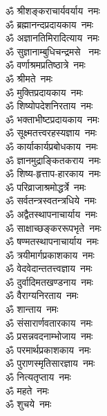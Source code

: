\begin{multicols}{2}
    \begin{flushleft}
        ॐ श्रीशङ्कराचार्यवर्याय~नमः\\
        ॐ ब्रह्मानन्दप्रदायकाय~नमः\\
        ॐ अज्ञानतिमिरादित्याय~नमः\\
        ॐ सुज्ञानाम्बुधिचन्द्रमसे ~नमः\\
        ॐ वर्णाश्रमप्रतिष्ठात्रे~नमः\\
        ॐ श्रीमते~नमः\\
        ॐ मुक्तिप्रदायकाय~नमः\\
        ॐ शिष्योपदेशनिरताय~नमः\\
        ॐ भक्ताभीष्टप्रदायकाय~नमः\\
        ॐ सूक्ष्मतत्त्वरहस्यज्ञाय~नमः\hfill{}\\
                                        
        ॐ कार्याकार्यप्रबोधकाय~नमः\\
        ॐ ज्ञानमुद्राङ्कितकराय~नमः\\
        ॐ शिष्य-हृत्ताप-हारकाय~नमः\\
        ॐ परिव्राजाश्रमोद्धर्त्रे~नमः\\
        ॐ सर्वतन्त्रस्वतन्त्रधिये~नमः\\
        ॐ अद्वैतस्थापनाचार्याय~नमः\\
        ॐ साक्षाच्छङ्कररूपभृते~नमः\\
        ॐ षण्मतस्थापनाचार्याय~नमः\\
        ॐ त्रयीमार्गप्रकाशकाय~नमः\\
        ॐ वेदवेदान्ततत्त्वज्ञाय~नमः\hfill{}\\
                                        
        ॐ दुर्वादिमतखण्डनाय~नमः\\
        ॐ वैराग्यनिरताय~नमः\\
        ॐ शान्ताय~नमः\\
        ॐ संसारार्णवतारकाय~नमः\\
        ॐ प्रसन्नवदनाम्भोजाय~नमः\\
        ॐ परमार्थप्रकाशकाय~नमः\\
        ॐ पुराणस्मृतिसारज्ञाय~नमः\\
        ॐ नित्यतृप्ताय~नमः\\
        ॐ महते~नमः\\
        ॐ शुचये~नमः\hfill{}\\
                                        

\end{flushleft}
\end{multicols}
